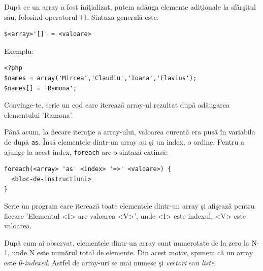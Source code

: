 
După ce un array a fost iniţializat, putem adăuga elemente adiţionale
la sfârşitul său, folosind operatorul \texttt{[]}. Sintaxa generală este:
\begin{verbatim}
$<array>'[]' = <valoare>
\end{verbatim}
Exemplu:
\begin{lstlisting}[label=lst:push_operator,caption={Adăugarea elementelor la sfârşitul unui array}]
<?php
$names = array('Mircea','Claudiu','Ioana','Flavius');
$names[] = 'Ramona';
\end{lstlisting}
Convinge-te, scrie un cod care iterează array-ul rezultat după adăugarea
elementului 'Ramona'.

Până acum, la fiecare iteraţie a array-ului, valoarea curentă era
pusă în variabila de după \texttt{as}. Însă elementele dintr-un array
au şi un index, o ordine. Pentru a ajunge la acest index, \texttt{foreach}
are o sintaxă extinsă:
\begin{verbatim}
foreach(<array> 'as' <index> '=>' <valoare>) {
  <bloc-de-instructiuni>
}
\end{verbatim}

\begin{Exercise}[title={Sintaxa foreach},difficulty=2]
Scrie un program care iterează toate elementele dintr-un array
şi afişează pentru fiecare 'Elementul <I> are valoarea <V>', unde <I>
este indexul, <V> este valoarea.

\end{Exercise}

După cum ai observat, elementele dintr-un array sunt numerotate
de la zero la N-1, unde N este numărul total de elemente. Din acest motiv,
spunem că un array este \textsl{0-indexed}. Astfel de array-uri se
mai numesc şi \textsl{vectori} sau \textsl{liste}.

